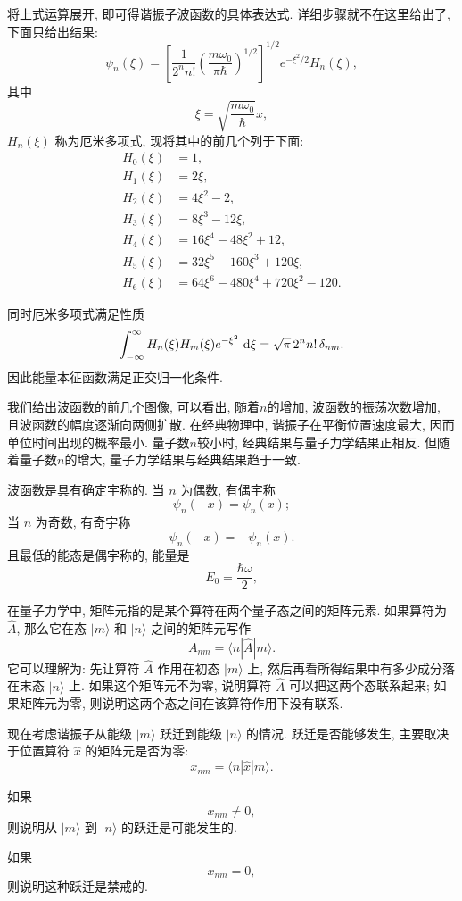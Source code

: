 将上式运算展开, 即可得谐振子波函数的具体表达式.
详细步骤就不在这里给出了, 下面只给出结果:
\[
\psi_n(\xi)
=
\left[
\dfrac{1}{2^n n!}
\left( \dfrac{m\omega_0}{\pi\hbar} \right)^{1/2}
\right]^{1/2}
e^{-\xi^2/2}H_n(\xi),
\]
其中
\[
\xi=\sqrt{\dfrac{m\omega_0}{\hbar}}x,
\]
$H_n(\xi)$ 称为厄米多项式, 现将其中的前几个列于下面:
\[
\begin{aligned}
H_0(\xi) &= 1, \\
H_1(\xi) &= 2\xi, \\
H_2(\xi) &= 4\xi^2 - 2, \\
H_3(\xi) &= 8\xi^3 - 12\xi, \\
H_4(\xi) &= 16\xi^4 - 48\xi^2 + 12, \\
H_5(\xi) &= 32\xi^5 - 160\xi^3 + 120\xi, \\
H_6(\xi) &= 64\xi^6 - 480\xi^4 + 720\xi^2 - 120.
\end{aligned}
\]

同时厄米多项式满足性质
\[
\int_{-\infty}^{\infty}
H_n(\xi)H_m(\xi)e^{-\xi^2}\, \mathop{}\!\mathrm{d}\xi
=
\sqrt{\pi}\, 2^n n!\, \delta_{nm}.
\]
因此能量本征函数满足正交归一化条件.

我们给出波函数的前几个图像, 可以看出, 随着$n$的增加, 波函数的振荡次数增加, 且波函数的幅度逐渐向两侧扩散. 在经典物理中, 谐振子在平衡位置速度最大, 因而单位时间出现的概率最小. 量子数$n$较小时, 经典结果与量子力学结果正相反. 但随着量子数$n$的增大, 量子力学结果与经典结果趋于一致.



波函数是具有确定宇称的. 当 $n$ 为偶数, 有偶宇称
\[
\psi_n(-x)=\psi_n(x);
\]
当 $n$ 为奇数, 有奇宇称
\[
\psi_n(-x)=-\psi_n(x).
\]
且最低的能态是偶宇称的, 能量是
\[
E_0=\frac{\hbar\omega}{2},
\]


在量子力学中, 矩阵元指的是某个算符在两个量子态之间的矩阵元素.
如果算符为 $\hat{A}$, 那么它在态 $|m\rangle$ 和 $|n\rangle$ 之间的矩阵元写作
\[
A_{nm}=\langle n|\hat{A}|m\rangle.
\]
它可以理解为: 先让算符 $\hat{A}$ 作用在初态 $|m\rangle$ 上,
然后再看所得结果中有多少成分落在末态 $|n\rangle$ 上.
如果这个矩阵元不为零, 说明算符 $\hat{A}$ 可以把这两个态联系起来;
如果矩阵元为零, 则说明这两个态之间在该算符作用下没有联系.

现在考虑谐振子从能级 $|m\rangle$ 跃迁到能级 $|n\rangle$ 的情况.
跃迁是否能够发生, 主要取决于位置算符 $\hat{x}$ 的矩阵元是否为零:
\[
x_{nm}=\langle n|\hat{x}|m\rangle.
\]

如果
\[
x_{nm}\neq 0,
\]
则说明从 $|m\rangle$ 到 $|n\rangle$ 的跃迁是可能发生的.

如果
\[
x_{nm}=0,
\]
则说明这种跃迁是禁戒的.

